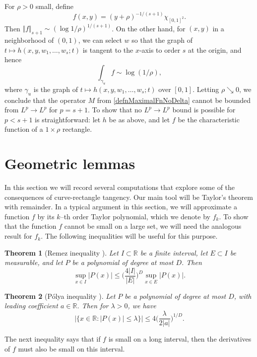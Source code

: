 \documentclass[letterpaper, reqno,11pt]{article}
\numberwithin{equation}{section}
\newcommand{\RR}{\mathbb{R}}
\newtheorem{thm}{Theorem}
\numberwithin{thm}{section}
\theoremstyle{remark}
\begin{document}
For $\rho>0$ small, define
\[
f(x,y) = (y+\rho)^{-1/(s+1)}\chi_{[0,1]^2}.
\]
Then $\Vert f \Vert_{s+1}\sim (\log 1/\rho)^{1/(s+1)}$. On the other hand, for $(x,y)$ in a neighborhood of $(0,1)$, we can select $w$ so that the graph of $t\mapsto h(x,y,w_1,\ldots,w_s;t)$ is tangent to the $x$-axis to order $s$ at the origin, and hence
\[
\int_{\gamma_u}f \sim \log(1/\rho),
\]
where $\gamma_u$ is the graph of $t\mapsto h(x,y,w_1,\ldots,w_s;t)$ over $[0,1]$. Letting $\rho\searrow 0$, we conclude that the operator $M$ from \eqref{defnMaximalFnNoDelta} cannot be bounded from $L^p\to L^p$ for $p=s+1$. To show that no $L^p\to L^p$ bound is possible for $p<s+1$ is straightforward: let $h$ be as above, and let $f$ be the characteristic function of a $1\times \rho$ rectangle.


\section{Geometric lemmas}\label{geometricLemmasSection}
In this section we will record several computations that explore some of the consequences of curve-rectangle tangency. Our main tool will be Taylor's theorem with remainder. In a typical argument in this section, we will approximate a function $f$ by its $k$--th order Taylor polynomial, which we denote by $f_k$. To show that the function $f$ cannot be small on a large set, we will need the analogous result for $f_k$. The following inequalities will be useful for this purpose.

\begin{thm}[Remez inequality ]\label{remezInequalityThm}
Let $I\subset\RR$ be a finite interval, let $E\subset I$ be measurable, and let $P$ be a polynomial of degree at most $D$. Then
\[
\sup_{x\in I}|P(x)|\leq \Big(\frac{4|I|}{|E|}\Big)^D\sup_{x\in E}|P(x)|.
\]
\end{thm}


\begin{thm}[P\'olya inequality ]\label{PolyaIneq}
Let $P$ be a polynomial of degree at most $D$, with leading coefficient $a\in\RR$. Then for $\lambda>0$, we have 
\[
|\{x\in\RR \colon |P(x)|\leq\lambda \}|\leq 4\Big(\frac{\lambda}{2|a|}\Big)^{1/D}.
\]
\end{thm}


The next inequality says that if $f$ is small on a long interval, then the derivatives of $f$ must also be small on this interval.
\end{document}
